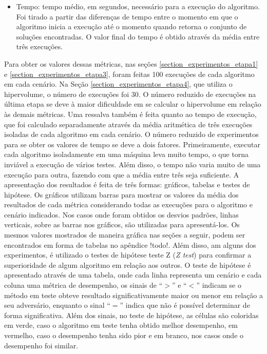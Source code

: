\begin{itemize}
	\item Tempo: tempo médio, em segundos, necessário para a execução do algoritmo. Foi tirado a partir das diferenças de tempo entre o momento em que o algoritmo inicia a execução até o momento quando retorna o conjunto de soluções encontradas. O valor final do tempo é obtido através da média entre três execuções.
\end{itemize}

Para obter os valores dessas métricas, nas seções \ref{section_experimentos_etapa1} e \ref{section_experimentos_etapa3}, foram feitas 100 execuções de cada algoritmo em cada cenário. Na Seção \ref{section_experimentos_etapa4}, que utiliza o hipervolume, o número de execuções foi 30. O número reduzido de execuções na última etapa se deve à maior dificuldade em se calcular o hipervolume em relação às demais métricas. Uma ressalva também é feita quanto ao tempo de execução, que foi calculado separadamente através da média aritmética de três execuções isoladas de cada algoritmo em cada cenário. O número reduzido de experimentos para se obter os valores de tempo se deve a dois fatores. Primeiramente, executar cada algoritmo isoladamente em uma máquina leva muito tempo, o que torna inviável a execução de vários testes. Além disso, o tempo não varia muito de uma execução para outra, fazendo com que a média entre três seja suficiente. A apresentação dos resultados é feita de três formas: gráficos, tabelas e testes de hipótese. Os gráficos utilizam barras para mostrar os valores da média dos resultados de cada métrica considerando todas as execuções para o algoritmo e cenário indicados. Nos casos onde foram obtidos os desvios padrões, linhas verticais, sobre as barras nos gráficos, são utilizadas para apresentá-los. Os mesmos valores mostrados de maneira gráfica nas seções a seguir, podem ser encontrados em forma de tabelas no apêndice !todo!. Além disso, am alguns dos experimentos, é utilizado o testes de hipótese teste Z (\textit{Z test}) para confirmar a superioridade de algum algoritmo em relação aos outros. O teste de hipótese é apresentado através de uma tabela, onde cada linha representa um cenário e cada coluna uma métrica de desempenho, os sinais de ``$>$'' e ``$<$'' indicam se o método em teste obteve resultado significativamente maior ou menor em relação a seu adversário, enquanto o sinal ``$=$'' indica que não é possível determinar de forma significativa. Além dos sinais, no teste de hipótese, as células são coloridas em verde, caso o algoritmo em teste tenha obtido melhor desempenho, em vermelho, caso o desempenho tenha sido pior e em branco, nos casos onde o desempenho foi similar.

